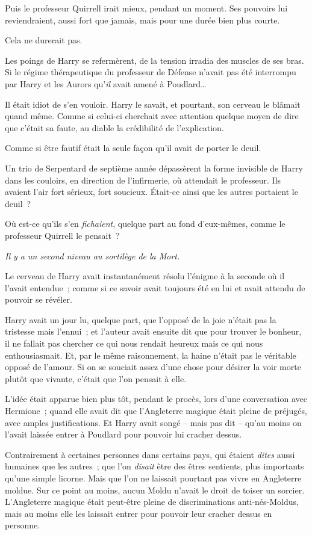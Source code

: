 Puis le professeur Quirrell irait mieux, pendant un moment. Ses pouvoirs lui reviendraient, aussi fort que jamais, mais pour une durée bien plus courte.

Cela ne durerait pas.

Les poings de Harry se refermèrent, de la tension irradia des muscles de ses bras. Si le régime thérapeutique du professeur de Défense n'avait pas été interrompu par Harry et les Aurors qu'\emph{il} avait amené à Poudlard…

Il était idiot de s'en vouloir. Harry le savait, et pourtant, son cerveau le blâmait quand même. Comme si celui-ci cherchait avec attention quelque moyen de dire que c'était sa faute, au diable la crédibilité de l'explication.

Comme si être fautif était la seule façon qu'il avait de porter le deuil.

Un trio de Serpentard de septième année dépassèrent la forme invisible de Harry dans les couloirs, en direction de l'infirmerie, où attendait le professeur. Ils avaient l'air fort sérieux, fort soucieux. Était-ce ainsi que les autres portaient le deuil~?

Où est-ce qu'ils s'en \emph{fichaient}, quelque part au fond d'eux-mêmes, comme le professeur Quirrell le pensait~?

\emph{Il y a un second niveau au sortilège de la Mort.}

Le cerveau de Harry avait instantanément résolu l'énigme à la seconde où il l'avait entendue~; comme si ce savoir avait toujours été en lui et avait attendu de pouvoir se révéler.

Harry avait un jour lu, quelque part, que l'opposé de la joie n'était pas la tristesse mais l'ennui~; et l'auteur avait ensuite dit que pour trouver le bonheur, il ne fallait pas chercher ce qui nous rendait heureux mais ce qui nous enthousiasmait. Et, par le même raisonnement, la haine n'était pas le véritable opposé de l'amour. Si on se souciait assez d'une chose pour désirer la voir morte plutôt que vivante, c'était que l'on pensait à elle.

L'idée était apparue bien plus tôt, pendant le procès, lors d'une conversation avec Hermione~; quand elle avait dit que l'Angleterre magique était pleine de préjugés, avec amples justifications. Et Harry avait songé -- mais pas dit -- qu'au moins on l'avait laissée entrer à Poudlard pour pouvoir lui cracher dessus.

Contrairement à certaines personnes dans certains pays, qui étaient \emph{dites} aussi humaines que les autres~; que l'on \emph{disait} être des êtres sentients, plus importants qu'une simple licorne. Mais que l'on ne laissait pourtant pas vivre en Angleterre moldue. Sur ce point au moins, aucun Moldu n'avait le droit de toiser un sorcier. L'Angleterre magique était peut-être pleine de discriminations anti-nés-Moldus, mais au moins elle les laissait entrer pour pouvoir leur cracher dessus en personne.

